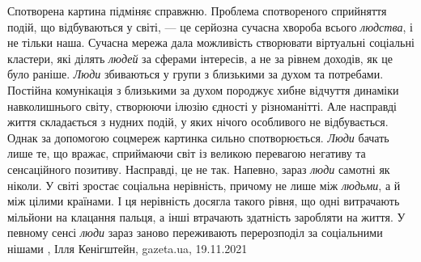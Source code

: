 Спотворена картина підміняє справжню. Проблема спотвореного сприйняття подій,
що відбуваються у світі, — це серйозна сучасна хвороба всього \emph{людства}, і
не тільки наша. Сучасна мережа дала можливість створювати віртуальні соціальні
кластери, які ділять \emph{людей} за сферами інтересів, а не за рівнем доходів,
як це було раніше. \emph{Люди} збиваються у групи з близькими за духом та
потребами.  Постійна комунікація з близькими за духом породжує хибне відчуття
динаміки навколишнього світу, створюючи ілюзію єдності у різноманітті.  Але
насправді життя складається з нудних подій, у яких нічого особливого не
відбувається. Однак за допомогою соцмереж картинка сильно спотворюється.
\emph{Люди} бачать лише те, що вражає, сприймаючи світ із великою перевагою
негативу та сенсаційного позитиву.  Насправді, це не так. Напевно, зараз
\emph{люди} самотні як ніколи. У світі зростає соціальна нерівність, причому не
лише між \emph{людьми}, а й між цілими країнами. І ця нерівність досягла такого
рівня, що одні витрачають мільйони на клацання пальця, а інші втрачають
здатність заробляти на життя. У певному сенсі \emph{люди} зараз заново
переживають перерозподіл за соціальними нішами
, 
Ілля Кенігштейн, gazeta.ua, 19.11.2021
